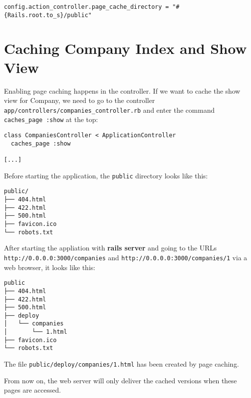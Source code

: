 \documentclass[a4paper]{book}
\begin{document}
\begin{shaded}\begin{verbatim}
config.action_controller.page_cache_directory = "#{Rails.root.to_s}/public"
\end{verbatim}\end{shaded}

\section{Caching Company Index and Show View}\label{caching-company-index-and-show-view}

Enabling page caching happens in the controller. If we want to cache the show view for Company, we need to go to the controller \texttt{app/controllers/companies\_controller.rb} and enter the command \texttt{caches\_page :show} at the top:

\begin{shaded}\begin{verbatim}
class CompaniesController < ApplicationController
  caches_page :show

[...]
\end{verbatim}\end{shaded}

Before starting the application, the \texttt{public} directory looks like this:

\begin{shaded}\begin{verbatim}
public/
├── 404.html
├── 422.html
├── 500.html
├── favicon.ico
└── robots.txt
\end{verbatim}\end{shaded}

After starting the appliation with \textbf{rails server} and going to the URLs \texttt{http://0.0.0.0:3000/companies} and \texttt{http://0.0.0.0:3000/companies/1} via a web browser, it looks like this:

\begin{shaded}\begin{verbatim}
public
├── 404.html
├── 422.html
├── 500.html
├── deploy
│   └── companies
│       └── 1.html
├── favicon.ico
└── robots.txt
\end{verbatim}\end{shaded}

The file \texttt{public/deploy/companies/1.html} has been created by page caching.

From now on, the web server will only deliver the cached versions when these pages are accessed.
\end{document}
